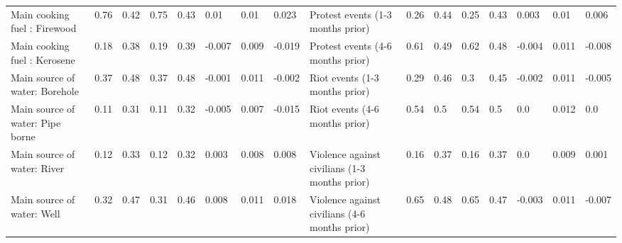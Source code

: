 \begin{table}[H]
{\begin{tabular}{@{}llllllll|llllllll@{}}
Main cooking fuel : Firewood & 0.76 & 0.42 & 0.75 & 0.43 & 0.01 & 0.01 & 0.023 & Protest events (1-3 months prior) & 0.26 & 0.44 & 0.25 & 0.43 & 0.003 & 0.01 & 0.006 \\
Main cooking fuel : Kerosene & 0.18 & 0.38 & 0.19 & 0.39 & -0.007 & 0.009 & -0.019 & Protest events (4-6 months prior) & 0.61 & 0.49 & 0.62 & 0.48 & -0.004 & 0.011 & -0.008 \\
Main source of water: Borehole & 0.37 & 0.48 & 0.37 & 0.48 & -0.001 & 0.011 & -0.002 & Riot events (1-3 months prior) & 0.29 & 0.46 & 0.3 & 0.45 & -0.002 & 0.011 & -0.005 \\
Main source of water: Pipe borne & 0.11 & 0.31 & 0.11 & 0.32 & -0.005 & 0.007 & -0.015 & Riot events (4-6 months prior) & 0.54 & 0.5 & 0.54 & 0.5 & 0.0 & 0.012 & 0.0 \\
Main source of water: River & 0.12 & 0.33 & 0.12 & 0.32 & 0.003 & 0.008 & 0.008 & Violence against civilians (1-3 months prior) & 0.16 & 0.37 & 0.16 & 0.37 & 0.0 & 0.009 & 0.001 \\
Main source of water: Well & 0.32 & 0.47 & 0.31 & 0.46 & 0.008 & 0.011 & 0.018 & Violence against civilians (4-6 months prior) & 0.65 & 0.48 & 0.65 & 0.47 & -0.003 & 0.011 & -0.007 \\
\bottomrule
\end{tabular}%
}
\end{table}
